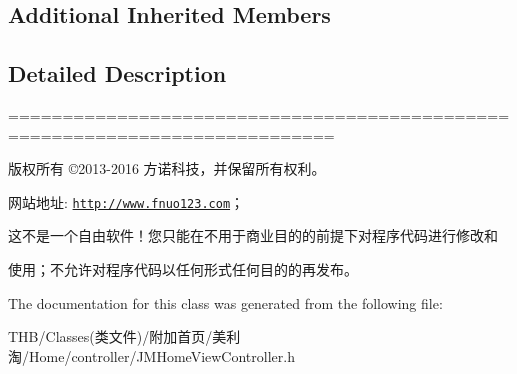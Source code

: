 \subsection*{Additional Inherited Members}


\subsection{Detailed Description}
============================================================================

版权所有 ©2013-\/2016 方诺科技，并保留所有权利。

网站地址\+: \href{http://www.fnuo123.com}{\tt http\+://www.\+fnuo123.\+com}； 



这不是一个自由软件！您只能在不用于商业目的的前提下对程序代码进行修改和

使用；不允许对程序代码以任何形式任何目的的再发布。 

 

The documentation for this class was generated from the following file\+:\begin{DoxyCompactItemize}
\item 
T\+H\+B/\+Classes(类文件)/附加首页/美利淘/\+Home/controller/J\+M\+Home\+View\+Controller.\+h\end{DoxyCompactItemize}
